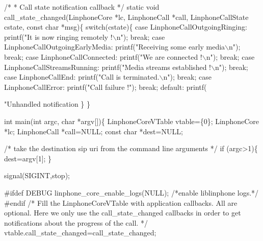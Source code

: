 \begin{DoxyCodeInclude}
\textcolor{comment}{/*}
\textcolor{comment}{ * Call state notification callback}
\textcolor{comment}{ */}
\textcolor{keyword}{static} \textcolor{keywordtype}{void} call\_state\_changed(LinphoneCore *lc, LinphoneCall *call, 
      LinphoneCallState cstate, \textcolor{keyword}{const} \textcolor{keywordtype}{char} *msg)\{
        \textcolor{keywordflow}{switch}(cstate)\{
                \textcolor{keywordflow}{case} LinphoneCallOutgoingRinging:
                        printf(\textcolor{stringliteral}{"It is now ringing remotely !\(\backslash\)n"});
                \textcolor{keywordflow}{break};
                \textcolor{keywordflow}{case} LinphoneCallOutgoingEarlyMedia:
                        printf(\textcolor{stringliteral}{"Receiving some early media\(\backslash\)n"});
                \textcolor{keywordflow}{break};
                \textcolor{keywordflow}{case} LinphoneCallConnected:
                        printf(\textcolor{stringliteral}{"We are connected !\(\backslash\)n"});
                \textcolor{keywordflow}{break};
                \textcolor{keywordflow}{case} LinphoneCallStreamsRunning:
                        printf(\textcolor{stringliteral}{"Media streams established !\(\backslash\)n"});
                \textcolor{keywordflow}{break};
                \textcolor{keywordflow}{case} LinphoneCallEnd:
                        printf(\textcolor{stringliteral}{"Call is terminated.\(\backslash\)n"});
                \textcolor{keywordflow}{break};
                \textcolor{keywordflow}{case} LinphoneCallError:
                        printf(\textcolor{stringliteral}{"Call failure !"});
                \textcolor{keywordflow}{break};
                \textcolor{keywordflow}{default}:
                        printf(\textcolor{stringliteral}{"Unhandled notification %
        \}
\}

\textcolor{keywordtype}{int} main(\textcolor{keywordtype}{int} argc, \textcolor{keywordtype}{char} *argv[])\{
        LinphoneCoreVTable vtable=\{0\};
        LinphoneCore *lc;
        LinphoneCall *call=NULL;
        \textcolor{keyword}{const} \textcolor{keywordtype}{char} *dest=NULL;

        \textcolor{comment}{/* take the destination sip uri from the command line arguments */}
        \textcolor{keywordflow}{if} (argc>1)\{
                dest=argv[1];
        \}

        signal(SIGINT,stop);

\textcolor{preprocessor}{#ifdef DEBUG}
        linphone_core_enable_logs(NULL); \textcolor{comment}{/*enable liblinphone logs.*/}
\textcolor{preprocessor}{#endif}
        \textcolor{comment}{/* }
\textcolor{comment}{         Fill the LinphoneCoreVTable with application callbacks.}
\textcolor{comment}{         All are optional. Here we only use the call\_state\_changed callbacks}
\textcolor{comment}{         in order to get notifications about the progress of the call.}
\textcolor{comment}{         */}
        vtable.call_state_changed=call\_state\_changed;

}
\end{DoxyCodeInclude}

